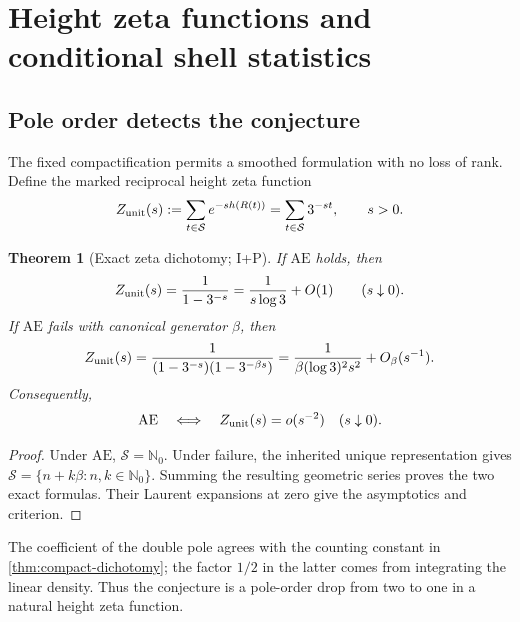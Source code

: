 \documentclass[10pt,oneside]{article}
\newtheorem{theorem}{Theorem}[section]
\theoremstyle{definition}
\theoremstyle{remark}
\newcommand{\Nzero}{\mathbb N_0}
\newcommand{\Sol}{\mathcal S}
\newcommand{\logheight}{h}
\newcommand{\AEconj}{\mathrm{AE}}
\newcommand{\statusP}{\textsc{P}}
\newcommand{\statusI}{\textsc{I}}
\begin{document}
\section{Height zeta functions and conditional shell statistics}
\label{sec:height-zeta}

\subsection{Pole order detects the conjecture}
The fixed compactification permits a smoothed formulation with no loss of rank.  Define the marked reciprocal height zeta function
\begin{equation}
 Z_{\rm unit}(s)
 :=\sum_{t\in\Sol}e^{-s\logheight(R(t))}
 =\sum_{t\in\Sol}3^{-st},
 \qquad s>0.
\label{eq:height-zeta}
\end{equation}

\begin{theorem}[Exact zeta dichotomy; \statusI+\statusP]
\label{thm:zeta-dichotomy}
If \(\AEconj\) holds, then
\begin{equation}
 Z_{\rm unit}(s)=\frac1{1-3^{-s}}
 =\frac1{s\log3}+O(1)
 \qquad(s\downarrow0).
\label{eq:zeta-true}
\end{equation}
If \(\AEconj\) fails with canonical generator \(\beta\), then
\begin{equation}
 Z_{\rm unit}(s)
 =\frac1{(1-3^{-s})(1-3^{-\beta s})}
 =\frac1{\beta(\log3)^2s^2}+O_\beta(s^{-1}).
\label{eq:zeta-false}
\end{equation}
Consequently,
\begin{equation}
 \AEconj
 \quad\Longleftrightarrow\quad
 Z_{\rm unit}(s)=o(s^{-2})
 \quad(s\downarrow0).
\label{eq:zeta-criterion}
\end{equation}
\end{theorem}

\begin{proof}
Under \(\AEconj\), \(\Sol=\Nzero\).  Under failure, the inherited unique representation gives
\(\Sol=\{n+k\beta:n,k\in\Nzero\}\).  Summing the resulting geometric series proves the two exact formulas.  Their Laurent expansions at zero give the asymptotics and criterion.
\end{proof}

The coefficient of the double pole agrees with the counting constant in \cref{thm:compact-dichotomy}; the factor \(1/2\) in the latter comes from integrating the linear density.  Thus the conjecture is a pole-order drop from two to one in a natural height zeta function.
\end{document}
